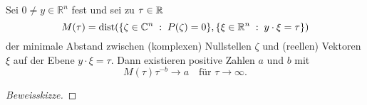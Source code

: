 \begin{lem}\label{3.2lem1}
Sei $0\neq y \in \mathbb R^n$ fest und sei zu $\tau\in\mathbb R$
\begin{equation}\label{3.2inf}
M(\tau) = \operatorname{dist}( \{ \zeta\in\mathbb C^n\;:\; P(\zeta)=0\} , \{ \xi\in\mathbb R^n \;:\; y\cdot\xi=\tau\} )
\end{equation}
der minimale Abstand zwischen (komplexen) Nullstellen $\zeta$ und (reellen) Vektoren $\xi$ auf der Ebene $y\cdot\xi=\tau$.
Dann existieren positive Zahlen $a$ und $b$ mit
\begin{equation}\label{3.2to}
M(\tau) \tau^{-b} \to a\quad \text{für } \tau \to \infty.
\end{equation}
\end{lem}
\begin{proof}[Beweisskizze]
% 
\end{proof}
  

